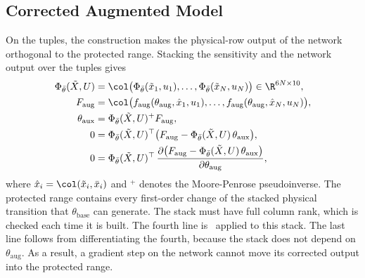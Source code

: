 \subsection{Corrected Augmented Model}\label{sec:obc_map}
On the tuples, the construction makes the physical-row output of the network
orthogonal to the protected range.
Stacking the sensitivity and the network output over the tuples gives
\begin{equation}
\begin{aligned}
 \Phi_{\bar\theta}(\tilde X,U)
 &=\col\bigl(\Phi_{\bar\theta}(\tilde x_1,u_1),\dots,
   \Phi_{\bar\theta}(\tilde x_N,u_N)\bigr)\in\R^{6N\times10},\\
 F_{\mathrm{aug}}
 &=\col\bigl(f_{\mathrm{aug}}(\theta_{\mathrm{aug}},\hat x_1,u_1),\dots,
   f_{\mathrm{aug}}(\theta_{\mathrm{aug}},\hat x_N,u_N)\bigr),\\
 \theta_{\mathrm{aux}}&=\Phi_{\bar\theta}(\tilde X,U)^{+}F_{\mathrm{aug}},\\
 0&=\Phi_{\bar\theta}(\tilde X,U)^\top
   \bigl(F_{\mathrm{aug}}-\Phi_{\bar\theta}(\tilde X,U)\,\theta_{\mathrm{aux}}\bigr),\\
 0&=\Phi_{\bar\theta}(\tilde X,U)^\top\,
   \frac{\partial\bigl(F_{\mathrm{aug}}-\Phi_{\bar\theta}(\tilde X,U)\,
   \theta_{\mathrm{aux}}\bigr)}{\partial\theta_{\mathrm{aug}}},
\end{aligned}
\label{eq:obc_ours}
\end{equation}
where $\hat x_i=\col(\tilde x_i,\bar x_i)$ and ${}^{+}$ denotes the
Moore-Penrose pseudoinverse.
The protected range contains every first-order change of the stacked
physical transition that $\theta_{\mathrm{base}}$ can generate.
The stack must have full column rank, which is checked each time it is
built.
The fourth line is~\cite[Lemma~3]{gyorok2026obc} applied to this stack.
The last line follows from differentiating the fourth, because the stack does
not depend on $\theta_{\mathrm{aug}}$.
As a result, a gradient step on the network cannot move its corrected output
into the protected range.

